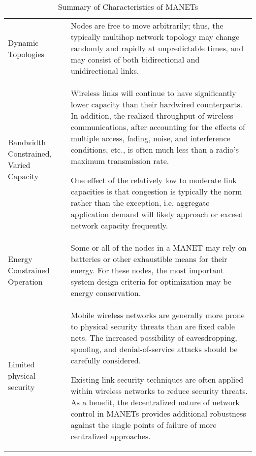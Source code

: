 \begin{table}
  \begin{tabularx}{\textwidth}{p{2cm}X}\toprule
    Dynamic Topologies & Nodes are free to move arbitrarily; thus, the typically multihop network topology may change randomly and rapidly at unpredictable times, and may consist of both bidirectional and unidirectional links. \\
    Bandwidth Constrained, Varied Capacity & Wireless links will continue to have significantly lower capacity than their hardwired counterparts. In addition, the realized throughput of wireless communications, after accounting for the effects of multiple access, fading, noise, and interference conditions, etc., is often much less than a radio's maximum transmission rate. \par
One effect of the relatively low to moderate link capacities is that congestion is typically the norm rather than the exception, i.e.  aggregate application demand will likely approach or exceed network capacity frequently.\\
    Energy Constrained Operation &  Some or all of the nodes in a MANET may rely on batteries or other exhaustible means for their energy. For these nodes, the most important system design criteria for optimization may be energy conservation.\\
    Limited physical security & Mobile wireless networks are generally more prone to physical security threats than are fixed cable nets.  The increased possibility of eavesdropping, spoofing, and denial-of-service attacks should be carefully considered.\par
Existing link security techniques are often applied within wireless networks to reduce security threats. 
As a benefit, the decentralized nature of network control in MANETs provides additional robustness against the single points of failure of more centralized approaches.\\

\end{tabularx}
\caption{Summary of Characteristics of MANETs\cite{Corson1999}}
\label{tab:manet_characteristics}
\end{table}






\ifx\ifthesis\undefined
	
\else
\fi
